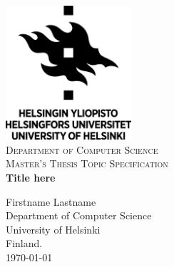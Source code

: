 \begin{titlepage}
\begin{center}

\includegraphics[width=0.35\textwidth]{./uh_logo}~\\[0.5 cm]

\textsc{\Large Department of Computer Science}\\[1.5cm]

\textsc{\large Master's Thesis Topic Specification}\\[1.5cm]


{ \huge \bfseries Title here \\[0.4cm] }


\Large Firstname Lastname \\
\large Department of Computer Science \\ University of Helsinki \\Finland.
\\ [4 cm]

\Large \today

\end{center}
\end{titlepage}